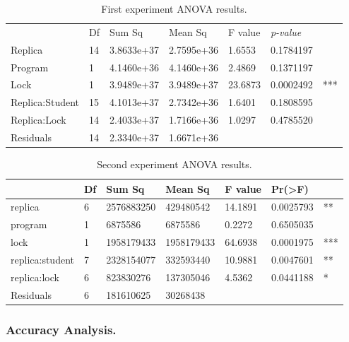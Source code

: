 \begin{table}%
\begin{center}
\caption{First experiment ANOVA results.}\label{tab:unova1}
\begin{tabular}{|l|l|l|l|l|ll|}
\hline
                & Df &    Sum Sq  &  Mean Sq   & F value & \emph{p-value} &     \\  
Replica         & 14 & 3.8633e+37 & 2.7595e+36 & 1.6553  & 0.1784197 &     \\   
Program         & 1  & 4.1460e+36 & 4.1460e+36 & 2.4869  & 0.1371197 &     \\   
Lock            & 1  & 3.9489e+37 & 3.9489e+37 & 23.6873 & 0.0002492 & *** \\
Replica:Student & 15 & 4.1013e+37 & 2.7342e+36 & 1.6401  & 0.1808595 &     \\  
Replica:Lock    & 14 & 2.4033e+37 & 1.7166e+36 & 1.0297  & 0.4785520 &     \\  
Residuals       & 14 & 2.3340e+37 & 1.6671e+36 &         &           &     \\
\hline
\end{tabular}
\end{center}
\end{table}

\begin{table}%
\begin{center}
\caption{Second experiment ANOVA results.}\label{tab:unova2}
\begin{tabular}{|l|l|l|l|l|ll|}
\hline
                 & Df &    Sum Sq &   Mean Sq  & F value &   Pr(>F) & \\   
\hline
replica          & 6 & 2576883250 &  429480542 & 14.1891 & 0.0025793 & **  \\
program          & 1 &    6875586 &    6875586 &  0.2272 & 0.6505035 &     \\
lock             & 1 & 1958179433 & 1958179433 & 64.6938 & 0.0001975 & *** \\
replica:student  & 7 & 2328154077 &  332593440 & 10.9881 & 0.0047601 & **  \\
replica:lock     & 6 &  823830276 &  137305046 &  4.5362 & 0.0441188 & *   \\
Residuals        & 6 &  181610625 &   30268438 &         &           &     \\
\hline
\end{tabular}
\end{center}
\end{table}

\subsubsection{Accuracy Analysis.}

